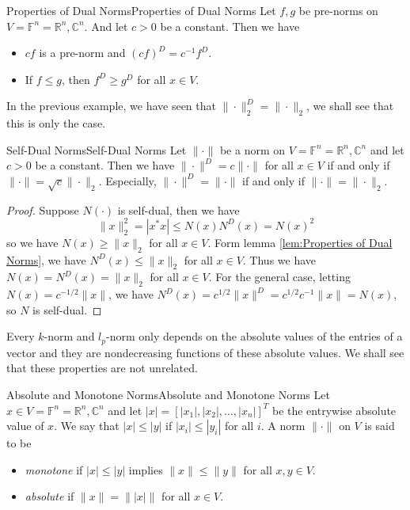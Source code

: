 \documentclass[../main.tex]{subfiles}
\begin{document}
\begin{lemma}{Properties of Dual Norms}{Properties of Dual Norms}
  Let $f,g$ be pre-norms on $V = \mathbb{F}^n = \mathbb{R}^n, \mathbb{C}^n$. And let $c>0$ be a constant. Then we have
  \begin{itemize}
    \item $cf$ is a pre-norm and $(cf)^D = c^{-1} f^D$.
    \item If $f \leq g$, then $f^D \geq g^D$ for all $x \in V$.
  \end{itemize}
\end{lemma}

In the previous example, we have seen that $\|\cdot\|_2^D = \|\cdot\|_2$, we shall see that this is only the case.

\begin{theorem}{Self-Dual Norms}{Self-Dual Norms}
  Let $\|\cdot\|$ be a norm on $V = \mathbb{F}^n = \mathbb{R}^n, \mathbb{C}^n$ and let $c>0$ be a constant. Then we have $\|\cdot\|^D = c \|\cdot\|$ for all $x \in V$ if and only if $\|\cdot\| = \sqrt{c} \|\cdot\|_2$. Especially, $\|\cdot\|^D = \|\cdot\|$ if and only if $\|\cdot\| = \|\cdot\|_2$.
\end{theorem}
\begin{proof}
  Suppose $N(\cdot)$ is self-dual, then we have
  \begin{equation*}
    \|x\|_2^2 = |x^* x| \leq N(x) N^D(x) = N(x)^2
  \end{equation*}
  so we have $N(x) \geq \|x\|_2$ for all $x \in V$. Form lemma \ref{lem:Properties of Dual Norms}, we have $N^D(x) \leq \|x\|_2$ for all $x \in V$. Thus we have $N(x) = N^D(x) = \|x\|_2$ for all $x \in V$. For the general case, letting $N(x) = c^{-1/2} \|x\|$, we have $N^D(x) = c^{1/2} \|x\|^D = c^{1/2} c^{-1} \|x\| = N(x)$, so $N$ is self-dual.
\end{proof}

Every $k$-norm and $l_p$-norm only depends on the absolute values of the entries of a vector and they are nondecreasing functions of these absolute values. We shall see that these properties are not unrelated.

\begin{definition}{Absolute and Monotone Norms}{Absolute and Monotone Norms}
  Let $x \in V = \mathbb{F}^n = \mathbb{R}^n, \mathbb{C}^n$ and let $|x| = [|x_1|, |x_2|, \ldots, |x_n|]^T$ be the entrywise absolute value of $x$. We say that $|x| \leq |y|$ if $|x_i| \leq |y_i|$ for all $i$. A norm $\|\cdot\|$ on $V$ is said to be
  \begin{itemize}
    \item \textit{monotone} if $|x| \leq |y|$ implies $\|x\| \leq \|y\|$ for all $x,y \in V$.
    \item \textit{absolute} if $\|x\| = \||x|\|$ for all $x \in V$.
  \end{itemize}
\end{definition}
\end{document}
